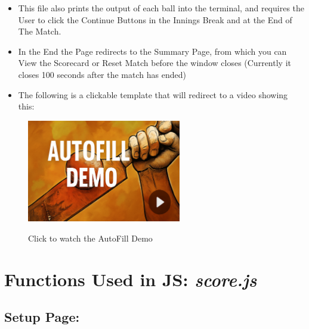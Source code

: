 \documentclass[a4paper,12pt]{article}
\begin{document}
\begin{enumerate}
\begin{itemize}
\begin{description}
    \end{description}
  \item This file also prints the output of each ball into the terminal, and requires the User to click the Continue Buttons in the Innings Break and at the End of The Match.
  \item In the End the Page redirects to the Summary Page, from which you can View the Scorecard or Reset Match before the window closes (Currently it closes 100 seconds after the match has ended)
  \item The following is a clickable template that will redirect to a video showing this:
  \end{itemize}
\end{enumerate}
\begin{figure}[h]
  \centering
  \href{https://drive.google.com/file/d/1Z6U6ZtFrIRRqnZfjVCqRuwvF0Dh_1dh4/view?usp=sharing}{
    \includegraphics[width=0.6\textwidth]{images/autofillDemo.png}
  }
  \caption{Click to watch the AutoFill Demo}
\end{figure}


\section{Functions Used in JS: \textit{score.js}}

\subsection{Setup Page:}
\label{basic1}
\end{document}
